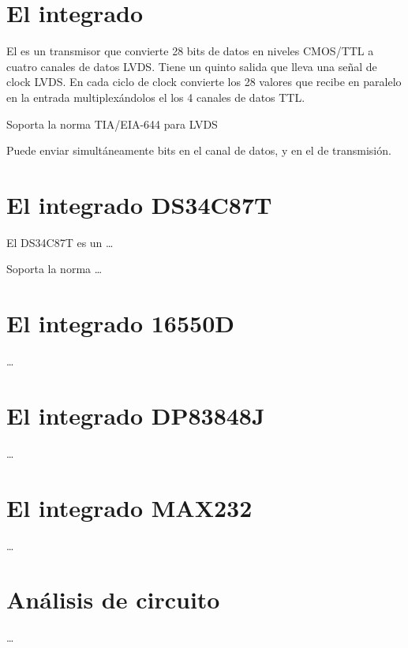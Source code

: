 \documentclass[a4paper]{article}
\begin{document}
\section{El integrado \ic}
%
El \ic es un transmisor que convierte 28 bits de datos en niveles CMOS/TTL a cuatro canales de datos
LVDS. Tiene un quinto salida que lleva una señal de clock LVDS. En cada ciclo de clock convierte los 28
valores que recibe en paralelo en la entrada multiplexándolos el los 4 canales de datos TTL.

Soporta la norma TIA/EIA-644 para LVDS 

Puede enviar simultáneamente  bits en el canal de datos, y  en el de transmisión.
%
\section{El integrado DS34C87T}
%
El DS34C87T es un \ldots

Soporta la norma \ldots
%
\section{El integrado 16550D}
%
\ldots
%
\section{El integrado DP83848J}
%
\ldots
%
\section{El integrado MAX232}
%
\ldots
%
\section{Análisis de circuito}
%
\ldots
%
\end{document}
